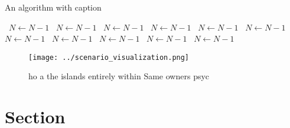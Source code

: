 \documentclass[a4paper]{article}
\begin{document}
\begin{algorithm}
\caption{An algorithm with caption}
\begin{algorithmic}
\    \State $N \gets N - 1$
\    \State $N \gets N - 1$
\    \State $N \gets N - 1$
\    \State $N \gets N - 1$
\    \State $N \gets N - 1$
\    \State $N \gets N - 1$
\    \State $N \gets N - 1$
\    \State $N \gets N - 1$
\    \State $N \gets N - 1$
\    \State $N \gets N - 1$
\    \State $N \gets N - 1$
\EndWhile
\end{algorithmic}
\end{algorithm}

\begin{figure}
\centering
\texttt{[image: ../scenario\_visualization.png]}
\caption{ho a the islands entirely within Same owners psyc
}
\end{figure}
 
\section{Section}
\end{document}
